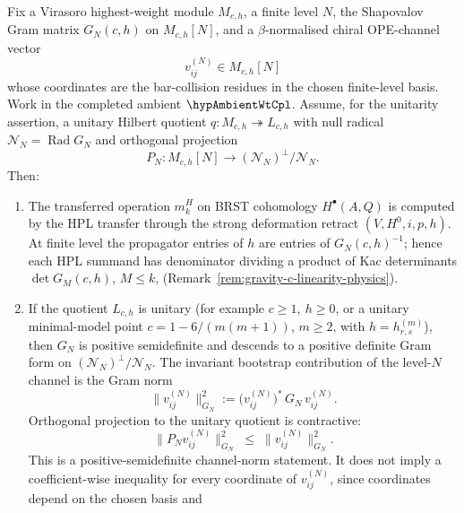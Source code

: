 \begin{theorem}
\label{thm:bootstrap-shapovalov}%
%
%
Fix a Virasoro highest-weight module \(M_{c,h}\), a finite level
\(N\), the Shapovalov Gram matrix \(G_N(c,h)\) on
\(M_{c,h}[N]\), and a \(\beta\)-normalised chiral OPE-channel vector
\[
 v_{ij}^{(N)}\in M_{c,h}[N]
\]
whose coordinates are the bar-collision residues in the chosen
finite-level basis. Work in the completed ambient
\(\hypAmbientWtCpl\).  Assume, for the unitarity assertion, a
unitary Hilbert quotient \(q\colon M_{c,h}\twoheadrightarrow L_{c,h}\)
with null radical
\(\mathcal N_N=\operatorname{Rad}G_N\) and orthogonal projection
\[
P_N\colon M_{c,h}[N]\longrightarrow
(\mathcal N_N)^\perp/\mathcal N_N .
\]
Then:
\begin{enumerate}[label=\textup{(\roman*)}]
\item The transferred operation $m_k^H$ on BRST cohomology
 $H^\bullet(A,Q)$ is computed by the HPL transfer through the
 strong deformation retract $(V, H^0, i, p, h)$.  At finite level
 the propagator entries of \(h\) are entries of \(G_N(c,h)^{-1}\);
 hence each HPL summand has denominator dividing a product of Kac
 determinants \(\det G_M(c,h)\), \(M\le k\),
 \textup{(}Remark~\textup{\ref{rem:gravity-c-linearity-physics})}.
\item If the quotient \(L_{c,h}\) is unitary
 \textup{(}for example \(c\ge1,\ h\ge0\), or a unitary minimal-model
 point \(c=1-6/(m(m+1))\), \(m\ge2\), with
 \(h=h^{(m)}_{r,s}\)\textup{)}, then \(G_N\) is positive semidefinite
 and descends to a positive definite Gram form on
 \((\mathcal N_N)^\perp/\mathcal N_N\).  The invariant bootstrap
 contribution of the level-\(N\) channel is the Gram norm
 \[
 \|v_{ij}^{(N)}\|_{G_N}^2
 := \bigl(v_{ij}^{(N)}\bigr)^*\,G_N\,v_{ij}^{(N)}.
 \]
 Orthogonal projection to the unitary quotient is contractive:
 \begin{equation}\label{eq:bootstrap-channel-contraction}
 \bigl\|P_N v_{ij}^{(N)}\bigr\|_{G_N}^2
 \;\le\;
 \bigl\|v_{ij}^{(N)}\bigr\|_{G_N}^2 .
 \end{equation}
 This is a positive-semidefinite channel-norm statement.  It does
 not imply a coefficient-wise inequality for every coordinate of
 \(v_{ij}^{(N)}\), since coordinates depend on the chosen basis and

\end{enumerate}
\end{theorem}
